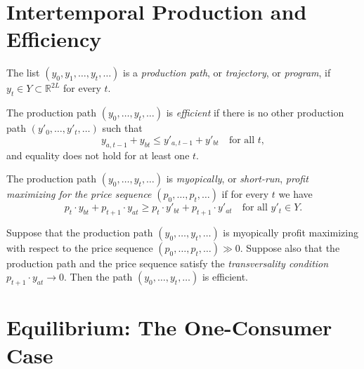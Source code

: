 \addtocounter{section}{1}

\addtocounter{section}{1}

\section{Intertemporal Production and Efficiency}

\begin{defn}
    The list $(y_0, y_1, \dots, y_t, \dots)$ is a \emph{production path}, or \emph{trajectory}, or \emph{program}, if $y_t \in Y \subset \mathbb{R}^{2L}$ for every $t$.
\end{defn}

\begin{defn}
    The production path $(y_0, \dots, y_t, \dots)$ is \emph{efficient} if there is no other production path $(y'_0, \dots, y'_t, \dots)$ such that 
    \begin{equation*}
        y_{a, t-1} + y_{bt} \leq y'_{a, t-1} + y'_{bt} \quad \text{for all } t,
    \end{equation*}
    and equality does not hold for at least one $t$.
\end{defn}

\begin{defn}
    The production path $(y_0, \dots, y_t, \dots)$ is \emph{myopically}, or \emph{short-run}, \emph{profit maximizing for the price sequence} $(p_0, \dots, p_t, \dots)$ if for every $t$ we have
    \begin{equation*}
        p_t \cdot y_{bt} + p_{t + 1} \cdot y_{at} \geq p_t \cdot y'_{bt} + p_{t + 1} \cdot y'_{at} \quad \text{for all } y'_t \in Y.
    \end{equation*}
\end{defn}

\begin{prop}
    Suppose that the production path $(y_0, \dots, y_t, \dots)$ is myopically profit maximizing with respect to the price sequence $(p_0, \dots, p_t, \dots) \gg 0$. Suppose also that the production path and the price sequence satisfy the \emph{transversality condition} $p_{t + 1} \cdot y_{at} \to 0$. Then the path $(y_0, \dots, y_t, \dots)$ is efficient.
\end{prop}


\section{Equilibrium: The One-Consumer Case}

